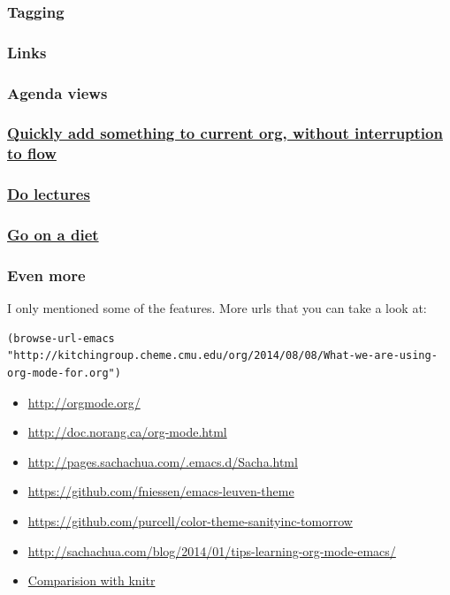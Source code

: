 \documentclass[11pt]{article}
\begin{document}
\subsubsection{Tagging}
\label{sec:orgheadline20}
\subsubsection{Links}
\label{sec:orgheadline21}
\subsubsection{Agenda views}
\label{sec:orgheadline22}
\subsubsection{\href{http://orgmode.org/manual/Capture.html#Capture}{Quickly add something to current org, without interruption to flow}}
\label{sec:orgheadline23}
\subsubsection{\href{https://www.youtube.com/watch?v=JZ8RK-R9O_g}{Do lectures}}
\label{sec:orgheadline24}
\subsubsection{\href{http://emacsporn.tumblr.com/post/4982654361/dieting-theres-an-org-mode-extension-for-that}{Go on a diet}}
\label{sec:orgheadline25}
\subsubsection{Even more}
\label{sec:orgheadline26}
I only mentioned some of the features. More urls that you can take a look at:

\begin{verbatim}
(browse-url-emacs "http://kitchingroup.cheme.cmu.edu/org/2014/08/08/What-we-are-using-org-mode-for.org")
\end{verbatim}
\begin{itemize}
\item \url{http://orgmode.org/}
\item \url{http://doc.norang.ca/org-mode.html}
\item \url{http://pages.sachachua.com/.emacs.d/Sacha.html}
\item \url{https://github.com/fniessen/emacs-leuven-theme}
\item \url{https://github.com/purcell/color-theme-sanityinc-tomorrow}
\item \url{http://sachachua.com/blog/2014/01/tips-learning-org-mode-emacs/}
\item \href{http://minimallysufficient.github.io/2015/10/24/org-mode-as-an-alternative-to-knitr.html}{Comparision with knitr}
\end{itemize}
\end{document}
